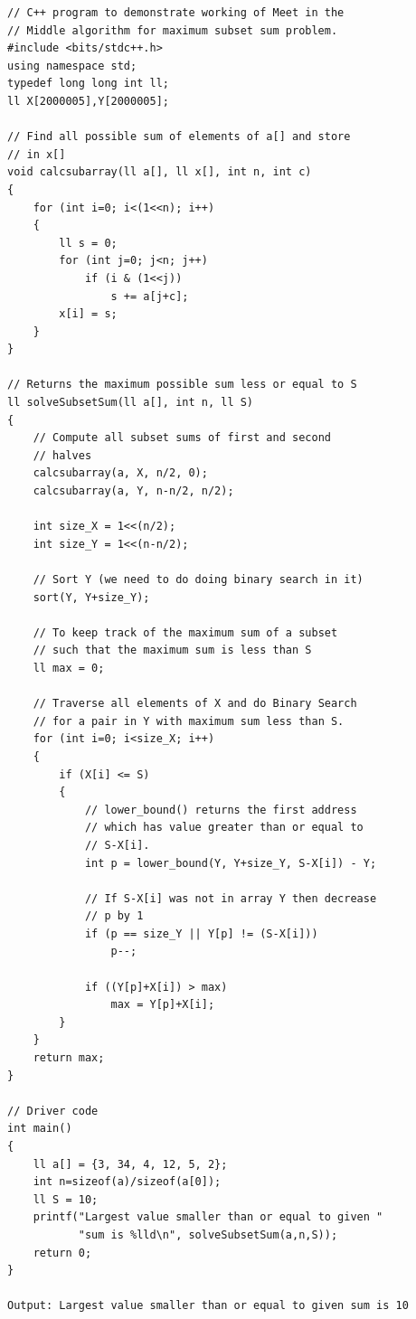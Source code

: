 \documentclass[8pt, a4paper, oneside, twocolumn]{extarticle}
\begin{document}
\begin{verbatim}
// C++ program to demonstrate working of Meet in the 
// Middle algorithm for maximum subset sum problem. 
#include <bits/stdc++.h> 
using namespace std; 
typedef long long int ll; 
ll X[2000005],Y[2000005]; 
  
// Find all possible sum of elements of a[] and store 
// in x[] 
void calcsubarray(ll a[], ll x[], int n, int c) 
{ 
    for (int i=0; i<(1<<n); i++) 
    { 
        ll s = 0; 
        for (int j=0; j<n; j++) 
            if (i & (1<<j)) 
                s += a[j+c]; 
        x[i] = s; 
    } 
} 
  
// Returns the maximum possible sum less or equal to S 
ll solveSubsetSum(ll a[], int n, ll S) 
{ 
    // Compute all subset sums of first and second 
    // halves 
    calcsubarray(a, X, n/2, 0); 
    calcsubarray(a, Y, n-n/2, n/2); 
  
    int size_X = 1<<(n/2); 
    int size_Y = 1<<(n-n/2); 
  
    // Sort Y (we need to do doing binary search in it) 
    sort(Y, Y+size_Y); 
  
    // To keep track of the maximum sum of a subset 
    // such that the maximum sum is less than S 
    ll max = 0; 
  
    // Traverse all elements of X and do Binary Search 
    // for a pair in Y with maximum sum less than S. 
    for (int i=0; i<size_X; i++) 
    { 
        if (X[i] <= S) 
        { 
            // lower_bound() returns the first address 
            // which has value greater than or equal to 
            // S-X[i]. 
            int p = lower_bound(Y, Y+size_Y, S-X[i]) - Y; 
  
            // If S-X[i] was not in array Y then decrease 
            // p by 1 
            if (p == size_Y || Y[p] != (S-X[i])) 
                p--; 
  
            if ((Y[p]+X[i]) > max) 
                max = Y[p]+X[i]; 
        } 
    } 
    return max; 
} 
  
// Driver code 
int main() 
{ 
    ll a[] = {3, 34, 4, 12, 5, 2}; 
    int n=sizeof(a)/sizeof(a[0]); 
    ll S = 10; 
    printf("Largest value smaller than or equal to given "
           "sum is %lld\n", solveSubsetSum(a,n,S)); 
    return 0; 
} 

Output: Largest value smaller than or equal to given sum is 10
\end{verbatim}
\end{document}
